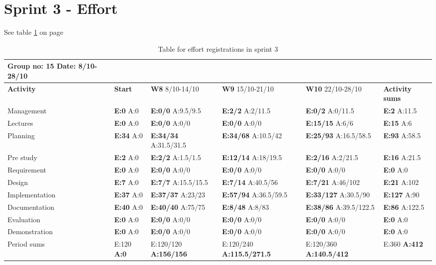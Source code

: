 \section{Sprint 3 - Effort}

See table \ref{tab:effortweekss3} on page \pageref{tab:effortweekss3}

\newpage

\begin{table}[htb]
\begin{tabularx}{\linewidth}{>{\setlength\hsize{.625\hsize}}X|>{\setlength\hsize{0.3\hsize}}X|>{\setlength\hsize{0.5\hsize}}X|>{\setlength\hsize{0.5\hsize}}X|>{\setlength\hsize{0.5\hsize}}X|>{\setlength\hsize{.3\hsize}}X}
Group no: 15 Date: 8/10-28/10  \\ \hline
\textbf{Activity} & \textbf{Start} & \textbf{W8} 8/10-14/10 & \textbf{W9} 15/10-21/10 & \textbf{W10} 22/10-28/10 & \textbf{Activity sums} \\ \hline \hline
Management & \textbf{E:0} A:0 & \textbf{E:0/0} A:9.5/9.5 & \textbf{E:2/2} A:2/11.5 & \textbf{E:0/2} A:0/11.5 & \textbf{E:2} A:11.5  \\ \hline
Lectures & \textbf{E:0} A:0 & \textbf{E:0/0} A:0/0 & \textbf{E:0/0} A:0/0 & \textbf{E:15/15} A:6/6 & \textbf{E:15} A:6  \\ \hline
Planning & \textbf{E:34} A:0 & \textbf{E:34/34} A:31.5/31.5 & \textbf{E:34/68} A:10.5/42 & \textbf{E:25/93} A:16.5/58.5 & \textbf{E:93} A:58.5  \\ \hline
Pre study & \textbf{E:2} A:0 & \textbf{E:2/2} A:1.5/1.5 & \textbf{E:12/14} A:18/19.5 & \textbf{E:2/16} A:2/21.5 & \textbf{E:16} A:21.5  \\ \hline
Requirement & \textbf{E:0} A:0 & \textbf{E:0/0} A:0/0 & \textbf{E:0/0} A:0/0 & \textbf{E:0/0} A:0/0 & \textbf{E:0} A:0 \\ \hline
Design & \textbf{E:7} A:0 & \textbf{E:7/7} A:15.5/15.5 & \textbf{E:7/14} A:40.5/56 & \textbf{E:7/21} A:46/102 & \textbf{E:21} A:102  \\ \hline
Implementation & \textbf{E:37} A:0 & \textbf{E:37/37} A:23/23 & \textbf{E:57/94} A:36.5/59.5 & \textbf{E:33/127} A:30.5/90 & \textbf{E:127} A:90  \\ \hline
Documentation & \textbf{E:40} A:0 & \textbf{E:40/40} A:75/75 & \textbf{E:8/48} A:8/83 & \textbf{E:38/86} A:39.5/122.5 & \textbf{E:86} A:122.5  \\ \hline
Evaluation & \textbf{E:0} A:0 & \textbf{E:0/0} A:0/0 & \textbf{E:0/0} A:0/0 & \textbf{E:0/0} A:0/0 & \textbf{E:0 } A:0  \\ \hline
Demonstration & \textbf{E:0} A:0 & \textbf{E:0/0} A:0/0 & \textbf{E:0/0} A:0/0 & \textbf{E:0/0} A:0/0 & \textbf{E:0 } A:0  \\ \hline
Period sums & E:120 \textbf{A:0} & E:120/120 \textbf{A:156/156} & E:120/240 \textbf{A:115.5/271.5} & E:120/360 \textbf{A:140.5/412} & E:360 \textbf{A:412} \\ \hline
\end{tabularx}

\caption{Table for effort registrations in sprint 3} \label{tab:effortweekss3}
\end{table}

